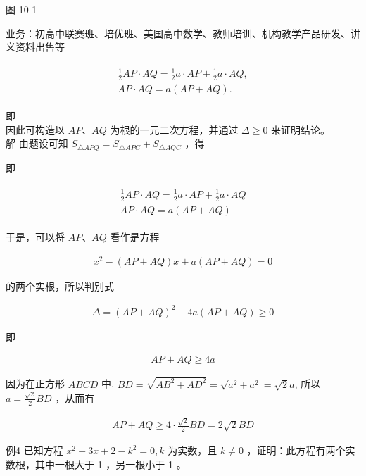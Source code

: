 \documentclass[10pt]{article}
\begin{document}
图 10-1

业务：初高中联赛班、培优班、美国高中数学、教师培训、机构教学产品研发、讲义资料出售等

\begin{align*}
\begin{gathered}
\frac{1}{2} A P \cdot A Q=\frac{1}{2} a \cdot A P+\frac{1}{2} a \cdot A Q, \\
A P \cdot A Q=a(A P+A Q) .
\end{gathered}
\end{align*}

即\\
因此可构造以 $A P 、 A Q$ 为根的一元二次方程，并通过 $\Delta \geqslant 0$ 来证明结论。\\
解 由题设可知 $S_{\triangle A P Q}=S_{\triangle A P C}+S_{\triangle A Q C}$ ，得

即

\begin{align*}
\begin{gathered}
\frac{1}{2} A P \cdot A Q=\frac{1}{2} a \cdot A P+\frac{1}{2} a \cdot A Q \\
A P \cdot A Q=a(A P+A Q)
\end{gathered}
\end{align*}

于是，可以将 $A P 、 A Q$ 看作是方程

\begin{align*}
x^{2}-(A P+A Q) x+a(A P+A Q)=0
\end{align*}

的两个实根，所以判别式

\begin{align*}
\Delta=(A P+A Q)^{2}-4 a(A P+A Q) \geqslant 0
\end{align*}

即

\begin{align*}
A P+A Q \geqslant 4 a
\end{align*}

因为在正方形 $A B C D$ 中, $B D=\sqrt{A B^{2}+A D^{2}}=\sqrt{a^{2}+a^{2}}=\sqrt{2} a$, 所以 $a=\frac{\sqrt{2}}{2} B D$ ，从而有

\begin{align*}
A P+A Q \geqslant 4 \cdot \frac{\sqrt{2}}{2} B D=2 \sqrt{2} B D
\end{align*}

例4 已知方程 $x^{2}-3 x+2-k^{2}=0, k$ 为实数，且 $k \neq 0$ ，证明：此方程有两个实数根，其中一根大于 1 ，另一根小于 1 。
\end{document}

